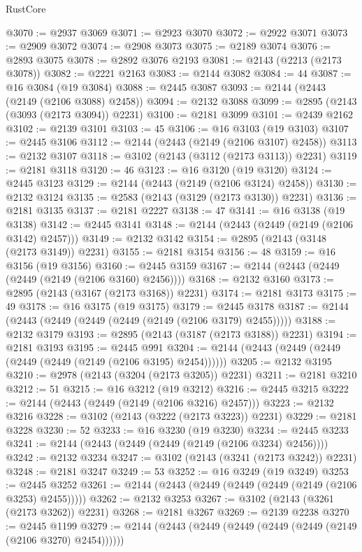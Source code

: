 \begin{lexlean}{RustCore}
\begin{coremodule}
@3070 := @2937 @3069
@3071 := @2923 @3070
@3072 := @2922 @3071
@3073 := @2909 @3072
@3074 := @2908 @3073
@3075 := @2189 @3074
@3076 := @2893 @3075
@3078 := @2892 @3076 @2193
@3081 := @2143 (@2213 (@2173 @3078))
@3082 := @2221 @2163
@3083 := @2144 @3082
@3084 := 44
@3087 := @16 @3084 (@19 @3084)
@3088 := @2445 @3087
@3093 := @2144 (@2443 (@2149 (@2106 @3088) @2458))
@3094 := @2132 @3088
@3099 := @2895 (@2143 (@3093 (@2173 @3094)) @2231)
@3100 := @2181 @3099
@3101 := @2439 @2162
@3102 := @2139 @3101
@3103 := 45
@3106 := @16 @3103 (@19 @3103)
@3107 := @2445 @3106
@3112 := @2144 (@2443 (@2149 (@2106 @3107) @2458))
@3113 := @2132 @3107
@3118 := @3102 (@2143 (@3112 (@2173 @3113)) @2231)
@3119 := @2181 @3118
@3120 := 46
@3123 := @16 @3120 (@19 @3120)
@3124 := @2445 @3123
@3129 := @2144 (@2443 (@2149 (@2106 @3124) @2458))
@3130 := @2132 @3124
@3135 := @2583 (@2143 (@3129 (@2173 @3130)) @2231)
@3136 := @2181 @3135
@3137 := @2181 @2227
@3138 := 47
@3141 := @16 @3138 (@19 @3138)
@3142 := @2445 @3141
@3148 := @2144 (@2443 (@2449 (@2149 (@2106 @3142) @2457)))
@3149 := @2132 @3142
@3154 := @2895 (@2143 (@3148 (@2173 @3149)) @2231)
@3155 := @2181 @3154
@3156 := 48
@3159 := @16 @3156 (@19 @3156)
@3160 := @2445 @3159
@3167 := @2144 (@2443 (@2449 (@2449 (@2149 (@2106 @3160) @2456))))
@3168 := @2132 @3160
@3173 := @2895 (@2143 (@3167 (@2173 @3168)) @2231)
@3174 := @2181 @3173
@3175 := 49
@3178 := @16 @3175 (@19 @3175)
@3179 := @2445 @3178
@3187 := @2144 (@2443 (@2449 (@2449 (@2449 (@2149 (@2106 @3179) @2455)))))
@3188 := @2132 @3179
@3193 := @2895 (@2143 (@3187 (@2173 @3188)) @2231)
@3194 := @2181 @3193
@3195 := @2445 @991
@3204 := @2144 (@2443 (@2449 (@2449 (@2449 (@2449 (@2149 (@2106 @3195) @2454))))))
@3205 := @2132 @3195
@3210 := @2978 (@2143 (@3204 (@2173 @3205)) @2231)
@3211 := @2181 @3210
@3212 := 51
@3215 := @16 @3212 (@19 @3212)
@3216 := @2445 @3215
@3222 := @2144 (@2443 (@2449 (@2149 (@2106 @3216) @2457)))
@3223 := @2132 @3216
@3228 := @3102 (@2143 (@3222 (@2173 @3223)) @2231)
@3229 := @2181 @3228
@3230 := 52
@3233 := @16 @3230 (@19 @3230)
@3234 := @2445 @3233
@3241 := @2144 (@2443 (@2449 (@2449 (@2149 (@2106 @3234) @2456))))
@3242 := @2132 @3234
@3247 := @3102 (@2143 (@3241 (@2173 @3242)) @2231)
@3248 := @2181 @3247
@3249 := 53
@3252 := @16 @3249 (@19 @3249)
@3253 := @2445 @3252
@3261 := @2144 (@2443 (@2449 (@2449 (@2449 (@2149 (@2106 @3253) @2455)))))
@3262 := @2132 @3253
@3267 := @3102 (@2143 (@3261 (@2173 @3262)) @2231)
@3268 := @2181 @3267
@3269 := @2139 @2238
@3270 := @2445 @1199
@3279 := @2144 (@2443 (@2449 (@2449 (@2449 (@2449 (@2149 (@2106 @3270) @2454))))))

\end{coremodule}
\end{lexlean}
